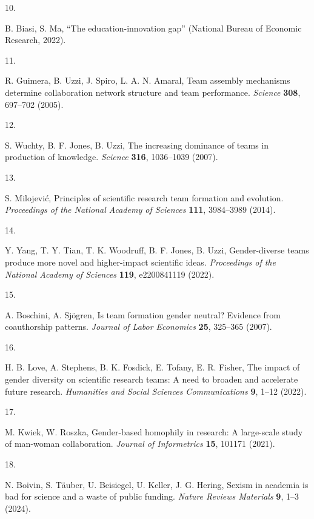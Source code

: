 \documentclass[
  12pt,
]{article}
\newlength{\cslhangindent}
\newlength{\csllabelwidth}
\newenvironment{CSLReferences}[2] %
 {\begin{list}{}{%
  \setlength{\itemindent}{0pt}
  \setlength{\leftmargin}{0pt}
  \setlength{\parsep}{0pt}
  \ifodd #1
   \setlength{\leftmargin}{\cslhangindent}
   \setlength{\itemindent}{-1\cslhangindent}
  \fi
  \setlength{\itemsep}{#2\baselineskip}}}
 {\end{list}}
\newcommand{\CSLLeftMargin}[1]{\parbox[t]{\csllabelwidth}{\strut#1\strut}}
\newcommand{\CSLRightInline}[1]{\parbox[t]{\linewidth - \csllabelwidth}{\strut#1\strut}}
\begin{document}
\begin{CSLReferences}{0}{1}
\CSLLeftMargin{10. }%
\CSLRightInline{B. Biasi, S. Ma, {``The education-innovation gap''} (National Bureau of Economic Research, 2022).}

\CSLLeftMargin{11. }%
\CSLRightInline{R. Guimera, B. Uzzi, J. Spiro, L. A. N. Amaral, Team assembly mechanisms determine collaboration network structure and team performance. \emph{Science} \textbf{308}, 697--702 (2005).}

\CSLLeftMargin{12. }%
\CSLRightInline{S. Wuchty, B. F. Jones, B. Uzzi, The increasing dominance of teams in production of knowledge. \emph{Science} \textbf{316}, 1036--1039 (2007).}

\CSLLeftMargin{13. }%
\CSLRightInline{S. Milojević, Principles of scientific research team formation and evolution. \emph{Proceedings of the National Academy of Sciences} \textbf{111}, 3984--3989 (2014).}

\CSLLeftMargin{14. }%
\CSLRightInline{Y. Yang, T. Y. Tian, T. K. Woodruff, B. F. Jones, B. Uzzi, Gender-diverse teams produce more novel and higher-impact scientific ideas. \emph{Proceedings of the National Academy of Sciences} \textbf{119}, e2200841119 (2022).}

\CSLLeftMargin{15. }%
\CSLRightInline{A. Boschini, A. Sjögren, Is team formation gender neutral? Evidence from coauthorship patterns. \emph{Journal of Labor Economics} \textbf{25}, 325--365 (2007).}

\CSLLeftMargin{16. }%
\CSLRightInline{H. B. Love, A. Stephens, B. K. Fosdick, E. Tofany, E. R. Fisher, The impact of gender diversity on scientific research teams: A need to broaden and accelerate future research. \emph{Humanities and Social Sciences Communications} \textbf{9}, 1--12 (2022).}

\CSLLeftMargin{17. }%
\CSLRightInline{M. Kwiek, W. Roszka, Gender-based homophily in research: A large-scale study of man-woman collaboration. \emph{Journal of Informetrics} \textbf{15}, 101171 (2021).}

\CSLLeftMargin{18. }%
\CSLRightInline{N. Boivin, S. Täuber, U. Beisiegel, U. Keller, J. G. Hering, Sexism in academia is bad for science and a waste of public funding. \emph{Nature Reviews Materials} \textbf{9}, 1--3 (2024).}


\end{CSLReferences}
\end{document}
